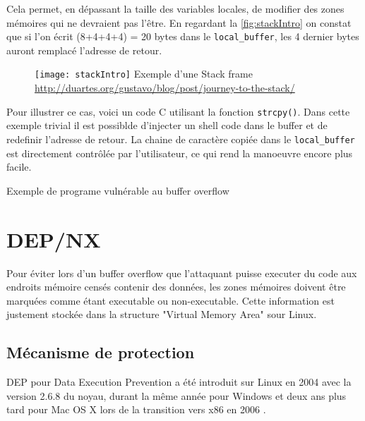 Cela permet, en dépassant la taille des variables locales, de modifier des zones mémoires qui ne devraient pas l'être. En regardant la \autoref{fig:stackIntro} on constat que si l'on écrit (8+4+4+4) = 20 bytes dans le \texttt{local_buffer}, les 4 dernier bytes auront remplacé l'adresse de retour.

\begin{figure}[H]
	\centering
	\texttt{[image: stackIntro]}
	{Exemple d'une Stack frame}
	{\url{http://duartes.org/gustavo/blog/post/journey-to-the-stack/}}
	\label{fig:stackIntro}
\end{figure}

Pour illustrer ce cas, voici un code C utilisant la fonction \texttt{strcpy()}. Dans cette exemple trivial il est possiblde d'injecter un shell code dans le buffer et de redefinir l'adresse de retour. La chaine de caractère copiée dans le \texttt{local_buffer} est directement contrôlée par l'utilisateur, ce qui rend la manoeuvre encore plus facile.

\begin{listing}
	\caption{Exemple de programe vulnérable au buffer overflow}
	\label{lst:buffer_overflow}
\end{listing}


\section{DEP/NX}

Pour éviter lors d'un buffer overflow que l'attaquant puisse executer du code aux endroits mémoire censés contenir des données, les zones mémoires doivent être marquées comme étant executable ou non-executable. Cette information est justement stockée dans la structure "Virtual Memory Area" sour Linux.

\subsection{Mécanisme de protection}

DEP pour Data Execution Prevention a été introduit sur Linux en 2004 avec la version 2.6.8 du noyau, durant la même année pour Windows et deux ans plus tard pour Mac OS X lors de la transition vers x86 en 2006 \cite{DataExecutionPrevention}.

